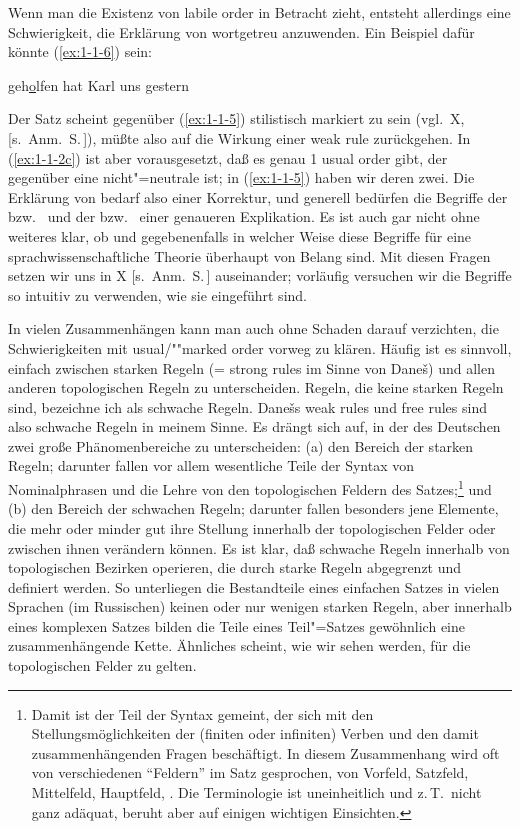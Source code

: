 \documentclass[output=paper]{langsci/langscibook}
\begin{document}
Wenn man die Existenz von labile order in Betracht zieht, entsteht allerdings eine
Schwierigkeit, die Erklärung von  wortgetreu anzuwenden. Ein Beispiel dafür könnte (\ref{ex:1-1-6}) sein:
\begin{exe}
\ex\label{ex:1-1-6}
geh\underline{\underline{o}}lfen hat Karl uns gestern
\end{exe}
Der Satz scheint gegenüber (\ref{ex:1-1-5}) stilistisch markiert zu sein (vgl.\ X, [s.\ Anm.\ S.\,\pageref{fn-herausgeber-topo}]), müßte also auf die
Wirkung einer weak rule zurückgehen. In (\ref{ex:1-1-2c}) ist aber vorausgesetzt, daß es genau 1 usual order gibt, der gegenüber eine nicht"=neutrale   ist; in (\ref{ex:1-1-5})
haben wir deren zwei. Die Erklärung von  bedarf also einer Korrektur, und generell bedürfen die Begriffe der  bzw.\  und der  bzw.\  einer genaueren Explikation. Es ist auch gar nicht ohne
weiteres klar, ob und gegebenenfalls in welcher Weise diese Begriffe für eine sprachwissenschaftliche Theorie überhaupt von Belang sind. Mit diesen Fragen setzen wir
uns in X [s.\ Anm.\ S.\,\pageref{fn-herausgeber-topo}] auseinander; vorläufig versuchen wir die Begriffe so intuitiv zu verwenden, wie sie eingeführt sind.

In vielen Zusammenhängen kann man auch ohne Schaden darauf verzichten, die
Schwierigkeiten mit usual/""marked order vorweg zu klären. Häufig ist es sinnvoll,
einfach zwischen starken Regeln (= strong rules im Sinne von Dane\v{s}) und allen anderen topologischen Regeln zu unterscheiden. Regeln, die keine starken Regeln sind,
bezeichne ich als schwache Regeln. Dane\v{s}s weak rules und free rules sind also
schwache Regeln in meinem Sinne.
\ssubsection{}%
\label{subsec:1-1.3}
Es drängt sich auf, in der  des Deutschen zwei große Phänomenbereiche zu unterscheiden: (a)
den Bereich der starken Regeln; darunter fallen vor allem wesentliche Teile der Syntax von
Nominalphrasen und die Lehre von den topologischen Feldern des Satzes;\footnote{%
  Damit ist der Teil der Syntax gemeint, der sich mit den Stellungsmöglichkeiten der (finiten oder
  infiniten) Verben und den damit zusammenhängenden Fragen beschäftigt. In diesem Zusammenhang wird
  oft von verschiedenen "`Feldern"' im Satz gesprochen, \zb von Vorfeld, Satzfeld, Mittelfeld,
  Hauptfeld, . Die Terminologie ist uneinheitlich und z.\,T.\ nicht ganz adäquat, beruht aber
  auf einigen wichtigen Einsichten.%
} 
und (b) den Bereich der schwachen Regeln; darunter fallen besonders jene Elemente, die mehr oder minder gut ihre Stellung innerhalb
der topologischen Felder oder zwischen ihnen verändern können. Es ist klar, daß schwache Regeln
innerhalb von topologischen Bezirken operieren, die durch starke 
Regeln abgegrenzt und definiert werden. So unterliegen die Bestandteile eines einfachen Satzes in vielen Sprachen (\zb im Russischen) keinen oder nur wenigen starken
Regeln, aber innerhalb eines komplexen Satzes bilden die Teile eines Teil"=Satzes gewöhnlich eine zusammenhängende Kette. Ähnliches scheint, wie wir sehen werden,
für die topologischen Felder zu gelten.
\end{document}
